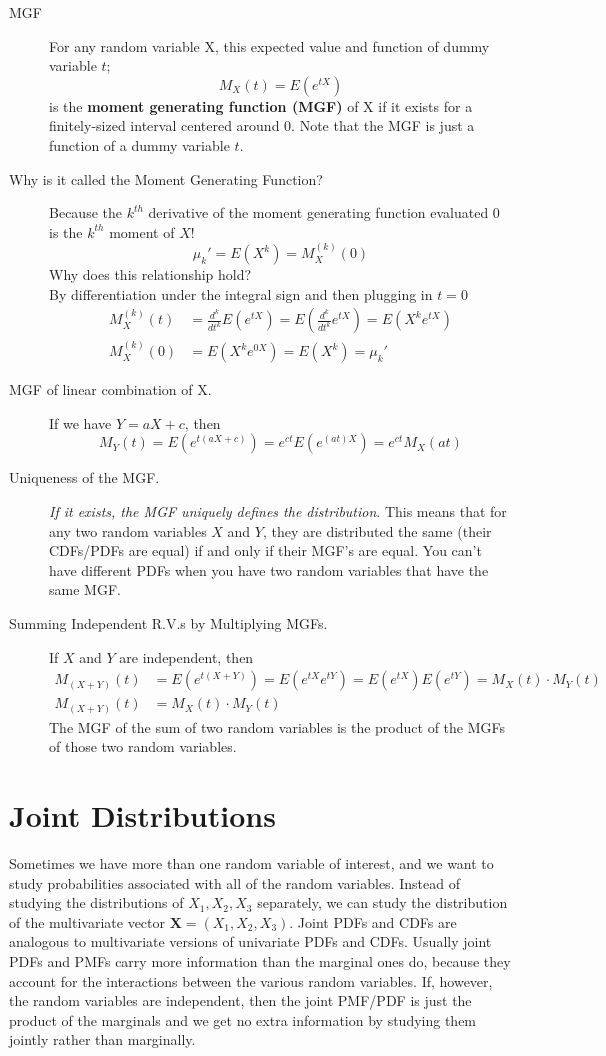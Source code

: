 \documentclass[11.5pt]{article}
\begin{document}
\begin{notes}
\begin{description}
	\item[MGF] For any random variable X, this expected value and function of dummy variable $t$;
		\[ M_X(t) = E(e^{tX}) \]
		is the \textbf{moment generating function (MGF)} of X if it exists for a finitely-sized interval centered around 0. Note that the MGF is just a function of a dummy variable $t$.
	\item[Why is it called the Moment Generating Function?] Because the $k^{th}$ derivative of the moment generating function evaluated 0 is the $k^{th}$ moment of $X$!
	\[\mu_k' = E(X^k) = M_X^{(k)}(0)\]
	Why does this relationship hold? \\
	By differentiation under the integral sign and then plugging in $t=0$
	\begin{align*}
		M_X^{(k)}(t) &= \frac{d^k}{dt^k}E(e^{tX}) = E(\frac{d^k}{dt^k}e^{tX}) = E(X^ke^{tX}) \\
		M_X^{(k)}(0) &= E(X^ke^{0X}) = E(X^k) = \mu_k'
	\end{align*}
	
	\item[MGF of linear combination of X.] If we have $Y = aX + c$, then
		\[M_Y(t) = E(e^{t(aX + c)}) =  e^{ct}E(e^{(at)X}) = e^{ct}M_X(at)\]
		
		
	\item[Uniqueness of the MGF.] \emph{If it exists, the MGF uniquely defines the distribution}. This means that for any two random variables $X$ and $Y$, they are distributed the same (their CDFs/PDFs are equal) if and only if their MGF's are equal. You can't have different PDFs when you have two random variables that have the same MGF.
	\item[Summing Independent R.V.s by Multiplying MGFs.] If $X$ and $Y$ are independent, then
	\begin{align*}
		M_{(X+Y)}(t) &= E(e^{t(X + Y)}) = E(e^{tX}e^{tY}) = E(e^{tX})E(e^{tY}) = M_X(t) \cdot M_Y(t) \\
		M_{(X+Y)}(t) &= M_X(t) \cdot M_Y(t)
	\end{align*}
	The MGF of the sum of two random variables is the product of the MGFs of those two random variables.
\end{description}

\newpage

\section*{Joint Distributions}
Sometimes we have more than one random variable of interest, and we want to study probabilities associated with all of the random variables. Instead of studying the distributions of $X_1, X_2, X_3$ separately, we can study the distribution of the multivariate vector $\textbf{X} = (X_1, X_2, X_3)$. Joint PDFs and CDFs are analogous to multivariate versions of univariate PDFs and CDFs. Usually joint PDFs and PMFs carry more information than the marginal ones do, because they account for the interactions between the various random variables. If, however, the random variables are independent, then the joint PMF/PDF is just the product of the marginals and we get no extra information by studying them jointly rather than marginally.


\end{notes}
\end{document}
